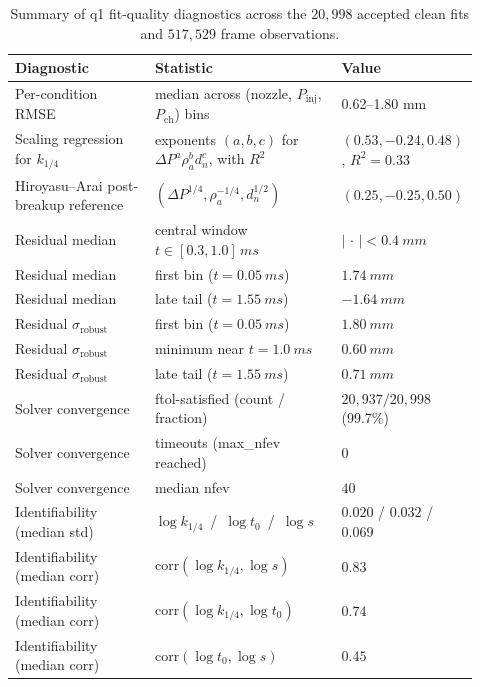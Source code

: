 \documentclass[english, 12pt, a4paper, elec, utf8, a-2b, online]{aaltothesis}
\begin{document}
\begin{table}[t]
\centering
\caption{Summary of q1 fit-quality diagnostics across the \(20{,}998\) accepted clean fits and \(517{,}529\) frame observations.}
\label{tab:q1-fit-diagnostics-summary}
\small
\begin{tabular}{p{0.30\linewidth} p{0.40\linewidth} p{0.22\linewidth}}
\toprule
\textbf{Diagnostic} & \textbf{Statistic} & \textbf{Value} \\
\midrule
Per-condition RMSE & median across (nozzle, $P_{\mathrm{inj}}$, $P_{\mathrm{ch}}$) bins & 0.62--1.80 mm \\
\midrule
Scaling regression for $k_{1/4}$ & exponents $(a,b,c)$ for $\Delta P^a \rho_a^b d_n^c$, with $R^2$ & $(0.53, -0.24, 0.48)$, $R^2=0.33$ \\
Hiroyasu--Arai post-breakup reference & $(\Delta P^{1/4}, \rho_a^{-1/4}, d_n^{1/2})$ & $(0.25, -0.25, 0.50)$ \\
\midrule
Residual median & central window $t\in[0.3, 1.0]\,\si{ms}$ & $|\,\cdot\,| < \SI{0.4}{mm}$ \\
Residual median & first bin ($t=\SI{0.05}{ms}$) & $\SI{+1.74}{mm}$ \\
Residual median & late tail ($t=\SI{1.55}{ms}$) & $\SI{-1.64}{mm}$ \\
Residual $\sigma_{\mathrm{robust}}$ & first bin ($t=\SI{0.05}{ms}$) & $\SI{1.80}{mm}$ \\
Residual $\sigma_{\mathrm{robust}}$ & minimum near $t=\SI{1.0}{ms}$ & $\SI{0.60}{mm}$ \\
Residual $\sigma_{\mathrm{robust}}$ & late tail ($t=\SI{1.55}{ms}$) & $\SI{0.71}{mm}$ \\
\midrule
Solver convergence & ftol-satisfied (count / fraction) & $20{,}937 / 20{,}998$ (99.7\%) \\
Solver convergence & timeouts (max\_nfev reached) & $0$ \\
Solver convergence & median nfev & $40$ \\
\midrule
Identifiability (median std) & $\log k_{1/4}$ \,/\, $\log t_0$ \,/\, $\log s$ & $0.020$ / $0.032$ / $0.069$ \\
Identifiability (median corr) & $\mathrm{corr}(\log k_{1/4}, \log s)$ & $0.83$ \\
Identifiability (median corr) & $\mathrm{corr}(\log k_{1/4}, \log t_0)$ & $0.74$ \\
Identifiability (median corr) & $\mathrm{corr}(\log t_0, \log s)$ & $0.45$ \\
\bottomrule
\end{tabular}
\end{table}
\end{document}
